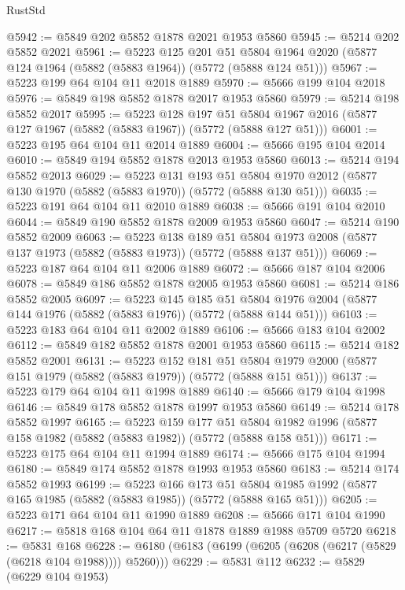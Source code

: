 \begin{lexlean}{RustStd}
\begin{coremodule}
{\begin{coremodule}
{{{{{{{{{{{{{{{{{{{{{{{{{{{{{@5942 := @5849 @202 @5852 @1878 @2021 @1953 @5860
@5945 := @5214 @202 @5852 @2021
@5961 := @5223
    @125
    @201
    @51
    @5804
    @1964
    @2020
    (@5877 @124 @1964 (@5882 (@5883 @1964)) (@5772 (@5888 @124 @51)))
@5967 := @5223 @199 @64 @104 @11 @2018 @1889
@5970 := @5666 @199 @104 @2018
@5976 := @5849 @198 @5852 @1878 @2017 @1953 @5860
@5979 := @5214 @198 @5852 @2017
@5995 := @5223
    @128
    @197
    @51
    @5804
    @1967
    @2016
    (@5877 @127 @1967 (@5882 (@5883 @1967)) (@5772 (@5888 @127 @51)))
@6001 := @5223 @195 @64 @104 @11 @2014 @1889
@6004 := @5666 @195 @104 @2014
@6010 := @5849 @194 @5852 @1878 @2013 @1953 @5860
@6013 := @5214 @194 @5852 @2013
@6029 := @5223
    @131
    @193
    @51
    @5804
    @1970
    @2012
    (@5877 @130 @1970 (@5882 (@5883 @1970)) (@5772 (@5888 @130 @51)))
@6035 := @5223 @191 @64 @104 @11 @2010 @1889
@6038 := @5666 @191 @104 @2010
@6044 := @5849 @190 @5852 @1878 @2009 @1953 @5860
@6047 := @5214 @190 @5852 @2009
@6063 := @5223
    @138
    @189
    @51
    @5804
    @1973
    @2008
    (@5877 @137 @1973 (@5882 (@5883 @1973)) (@5772 (@5888 @137 @51)))
@6069 := @5223 @187 @64 @104 @11 @2006 @1889
@6072 := @5666 @187 @104 @2006
@6078 := @5849 @186 @5852 @1878 @2005 @1953 @5860
@6081 := @5214 @186 @5852 @2005
@6097 := @5223
    @145
    @185
    @51
    @5804
    @1976
    @2004
    (@5877 @144 @1976 (@5882 (@5883 @1976)) (@5772 (@5888 @144 @51)))
@6103 := @5223 @183 @64 @104 @11 @2002 @1889
@6106 := @5666 @183 @104 @2002
@6112 := @5849 @182 @5852 @1878 @2001 @1953 @5860
@6115 := @5214 @182 @5852 @2001
@6131 := @5223
    @152
    @181
    @51
    @5804
    @1979
    @2000
    (@5877 @151 @1979 (@5882 (@5883 @1979)) (@5772 (@5888 @151 @51)))
@6137 := @5223 @179 @64 @104 @11 @1998 @1889
@6140 := @5666 @179 @104 @1998
@6146 := @5849 @178 @5852 @1878 @1997 @1953 @5860
@6149 := @5214 @178 @5852 @1997
@6165 := @5223
    @159
    @177
    @51
    @5804
    @1982
    @1996
    (@5877 @158 @1982 (@5882 (@5883 @1982)) (@5772 (@5888 @158 @51)))
@6171 := @5223 @175 @64 @104 @11 @1994 @1889
@6174 := @5666 @175 @104 @1994
@6180 := @5849 @174 @5852 @1878 @1993 @1953 @5860
@6183 := @5214 @174 @5852 @1993
@6199 := @5223
    @166
    @173
    @51
    @5804
    @1985
    @1992
    (@5877 @165 @1985 (@5882 (@5883 @1985)) (@5772 (@5888 @165 @51)))
@6205 := @5223 @171 @64 @104 @11 @1990 @1889
@6208 := @5666 @171 @104 @1990
@6217 := @5818 @168 @104 @64 @11 @1878 @1889 @1988 @5709 @5720
@6218 := @5831 @168
@6228 := @6180 (@6183 (@6199 (@6205 (@6208 (@6217 (@5829 (@6218 @104 @1988)))) @5260)))
@6229 := @5831 @112
@6232 := @5829 (@6229 @104 @1953)
}}}}}}}}}}}}}}}}}}}}}}}}}}}}}
\end{coremodule}}
\end{coremodule}
\end{lexlean}
